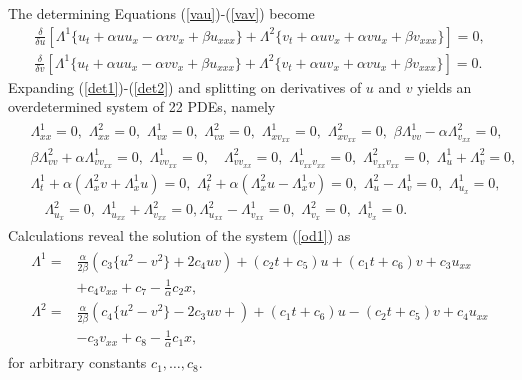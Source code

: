 The determining Equations  (\ref{vau})-(\ref{vav}) become
 \begin{align}
 \label{det1}\frac{\delta}{ \delta u} \left[ \Lambda^1 \{  u_t + \alpha u u_x - \alpha v v_x + \beta u_{xxx}   \}   + \Lambda^2 \{   v_t + \alpha u v_x + \alpha v u_x + \beta v_{xxx} \} \right] =0,\\
 \label{det2}\frac{\delta}{ \delta v} \left[ \Lambda^1 \{  u_t + \alpha u u_x - \alpha v v_x + \beta u_{xxx} \} + \Lambda^2 \{ v_t + \alpha u v_x + \alpha v u_x + \beta v_{xxx}  \} \right] =0.
 \end{align} 
 Expanding  (\ref{det1})-(\ref{det2})  and splitting on derivatives of $u$ and $v$ yields an overdetermined system of 22 PDEs, namely \begin{align} \begin{aligned} &\Lambda_{xx}^1=0, \,\,  \Lambda_{xx}^2=0, \,\, \Lambda_{vx}^1=0, \,\, \Lambda_{vx}^2=0, \,\,
 \Lambda_{xv_{xx}}^1=0, \,\,  \Lambda_{xv_{xx}}^2=0, \,\,  \beta \Lambda_{vv}^1-\alpha \Lambda_{v_{xx}}^2=0,
 \\
 & \beta \Lambda_{vv}^2+ \alpha \Lambda_{vv_{xx}}^1=0, \,\,
 \Lambda_{vv_{xx}}^1=0, \quad \Lambda^2_{vv_{xx}}=0, \,\, \Lambda_{v_{xx}v_{xx}}^1=0, \,\,
 \Lambda_{v_{xx}v_{xx}}^2=0, \,\,
 \Lambda^{1}_u+\Lambda^{2}_v=0, 
 \\ 
 &   \Lambda_{t}^1+ \alpha \left(\Lambda_{x}^2v +\Lambda_{x}^1u\right)=0,\,\,
 \Lambda_{t}^2+ \alpha \left( \Lambda_{x}^2u- \Lambda_{x}^1v\right)=0,  \,\,  \Lambda^{2}_u- \Lambda^{1}_v=0, \,\,\Lambda^{1}_{u_x}=0,
 \\ 
 &   
 \quad \Lambda^{2}_{u_x}=0, \,\, \Lambda^{1}_{u_{xx}}+ \Lambda^{2}_{v_{xx}}=0,  
 \Lambda^{2}_{u_{xx}}-\Lambda^{1}_{v_{xx}}=0, \,\, \Lambda^{2}_{v_{x}} =0 ,\,\, \Lambda^{1}_{v_{x}}=0 .
 \label{od1}
 \end{aligned}\end{align}
Calculations reveal the solution of the system (\ref{od1})
as  \begin{align} \begin{aligned}
\Lambda^1 =& \frac{\alpha }{ 2 \beta} \left( c_3 \{ u^2-v^2\} + 2c_4uv \right) 
+ (c_2t+c_5)u + (c_1t+c_6)v+ c_3 u_{xx}\\& + c_4v_{xx}  +c_7  -\frac{1}{\alpha} c_{2} x,\\
\Lambda^{2}=& \frac{\alpha }{2 \beta } \left(c_4 \{u^2-v^2\}  -2 c_3uv+  \right) +(c_1t + c_6)u-(c_2t +c_5)v +c_4 u_{xx} \\&-c_3 v_{xx}+c_8   - \frac{1}{ \alpha}c_1  x,\end{aligned} \end{align} for arbitrary constants $c_1,\ldots,c_8$.

